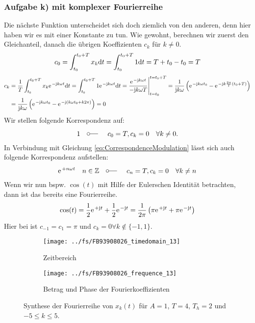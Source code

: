 \documentclass[11pt,a4paper,DIV=12]{scrartcl}
\begin{document}
\subsubsection{Aufgabe k) mit komplexer Fourierreihe}
%
%
Die nächste Funktion unterscheidet sich doch ziemlich von den anderen, denn hier
haben wir es mit einer Konstante zu tun.
%
Wie gewohnt, berechnen wir zuerst den Gleichanteil, danach die übrigen
Koeffizienten $c_k$ für $k\neq 0$.
%
\begin{align}
	c_0=\int_{t_0}^{t_0+T}x_{k}\mathrm{d} t
	=\int_{t_0}^{t_0+T}1\mathrm{d} t
	=T+t_0-t_0=T
\end{align}
%
\begin{align}
	c_k&=\frac{1}{T}\int_{t_0}^{t_0+T}x_{k}\e^{-\im k \omega t}\diff t
	=\int_{t_0}^{t_0+T}1\e^{-\im k \omega t}\diff t
	=\frac{\e^{-\im k \omega t}}{-\im k \omega T}\Bigg |_{t=t_0}^{t=t_0+T}
	=\frac{1}{\im k \omega }\left (\e^{-\im k \omega t_0}-\e^{-\im k \frac{2\pi}{T}(t_0+T)}\right )\nonumber \\
	&=\frac{1}{\im k \omega}\left (\e^{-\im k \omega t_0}-\e^{-\im (k \omega t_0+k2\pi )}\right )=0
\end{align}
%
Wir stellen folgende Korrespondenz auf:
%
\begin{align}
	1 \quad \fourier \quad c_0 = T,c_k=0\quad\forall k \neq 0.
\end{align}
%
In Verbindung mit Gleichung \eqref{eq:CorrespondenceModulation} lässt sich auch
folgende Korrespondenz aufstellen:
%
\begin{align}
	\e^{+n\omega t}\quad n\in\mathbb{Z}\quad \fourier\quad c_n=T,c_k=0\quad\forall k\neq n
\end{align}
%
Wenn wir nun bspw. $\cos(t)$ mit Hilfe der Eulerschen Identität betrachten,
dann ist das bereits eine Fourierreihe.
%
\begin{align}
	\cos(t)=\frac{1}{2}\e^{+\im t}+\frac{1}{2}\e^{-\im t}=\frac{1}{2\pi}\left(\pi\e^{+\im t}+\pi\e^{-\im t}\right)
\end{align}
%
Hier bei ist $c_{-1}=c_1=\pi$ und $c_k=0\forall k \not\in\{-1,1\}$.
%
\begin{figure}
	\centering
	\begin{subfigure}{\textwidth}
		\texttt{[image: ../fs/FB93908026\_timedomain\_13]}
		\caption{Zeitbereich}
	\end{subfigure}
	\begin{subfigure}{\textwidth}
		\texttt{[image: ../fs/FB93908026\_frequence\_13]}
		\caption{Betrag und Phase der Fourierkoeffizienten}
	\end{subfigure}
	\caption{Synthese der Fourierreihe von $x_k(t)$ für $A=1$, $T=4$, $T_h=2$ und
		$-5\leq k\leq5$.}
\end{figure}
%
\newpage
\end{document}
